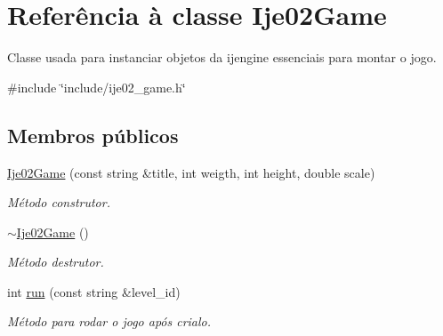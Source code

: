 \hypertarget{classIje02Game}{}\section{Referência à classe Ije02\+Game}
\label{classIje02Game}


Classe usada para instanciar objetos da ijengine essenciais para montar o jogo.  




{\ttfamily \#include \char`\"{}include/ije02\+\_\+game.\+h\char`\"{}}

\subsection*{Membros públicos}
\begin{DoxyCompactItemize}
\item 
\mbox{\hyperlink{classIje02Game_af24dc5ec68acaeeb66f74866a832133b}{Ije02\+Game}} (const string \&title, int weigth, int height, double scale)
\begin{DoxyCompactList}\small\item\em Método construtor. \end{DoxyCompactList}\item 
\mbox{\label{classIje02Game_aeeebc6b2bdfc7dd9ccabffcf96a8299f}} 
\mbox{\hyperlink{classIje02Game_aeeebc6b2bdfc7dd9ccabffcf96a8299f}{$\sim$\+Ije02\+Game}} ()
\begin{DoxyCompactList}\small\item\em Método destrutor. \end{DoxyCompactList}\item 
int \mbox{\hyperlink{classIje02Game_ac93c42997b7e79698960057d7c395990}{run}} (const string \&level\+\_\+id)
\begin{DoxyCompactList}\small\item\em Método para rodar o jogo após crialo. \end{DoxyCompactList}\end{DoxyCompactItemize}

